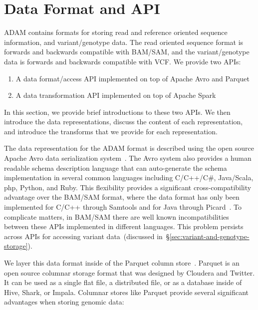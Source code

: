 \documentclass[10pt,twocolumn]{article}
\theoremstyle{plain}
\begin{document}
\section{Data Format and API}
\label{sec:data-format-and-api}

ADAM contains formats for storing read and reference oriented sequence information, and variant/genotype data.
The read oriented sequence format is forwards and backwards compatible with BAM/SAM, and the variant/genotype
data is forwards and backwards compatible with VCF. We provide two APIs:

\begin{enumerate}
\item A data format/access API implemented on top of Apache Avro and Parquet
\item A data transformation API implemented on top of Apache Spark
\end{enumerate}

In this section, we provide brief introductions to these two APIs. We then introduce the data representations, discuss the content
of each representation, and introduce the transforms that we provide for each representation.

The data representation for the ADAM format is described using the open source Apache Avro data serialization
system~\cite{avro}. The Avro system also provides a human readable schema description language that can
auto-generate the schema implementation in several common languages including C/C++/C\#, Java/Scala, php,
Python, and Ruby. This flexibility provides a significant cross-compatibility advantage over the BAM/SAM format,
where the data format has only been implemented for C/C++ through Samtools and for Java through
Picard~\cite{li09,picard}. To complicate matters, in BAM/SAM there are well known incompatibilities between these
APIs implemented in different languages. This problem persists across APIs for accessing variant data~(discussed
in~\S\ref{sec:variant-and-genotype-storage}).

We layer this data format inside of the Parquet column store~\cite{parquet}. Parquet is an open source columnar storage
format that was designed by Cloudera and Twitter. It can be used as a single flat file, a distributed file, or as a database inside of Hive, Shark, or Impala. Columnar stores like Parquet provide several significant advantages when storing genomic data:
\end{document}
